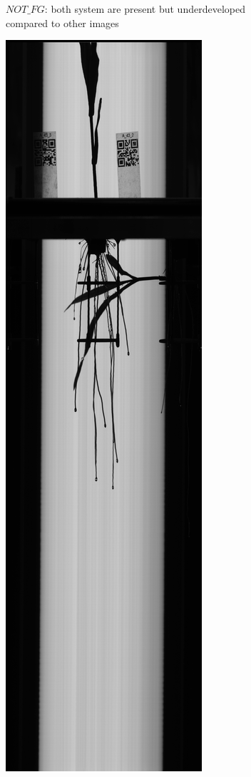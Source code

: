 \begin{figure}
\begin{subfigure}[b]{.13\textwidth}
  \caption{$NOT\_FG$: both system are present but underdeveloped compared to other images }
  \label{fig:NOT_FG}
\end{subfigure}
%
\begin{subfigure}[b]{.13\textwidth}
  \centering
  \includegraphics[width=\linewidth]{figures/OVERLAP.jpg}

\end{subfigure}
\end{figure}
